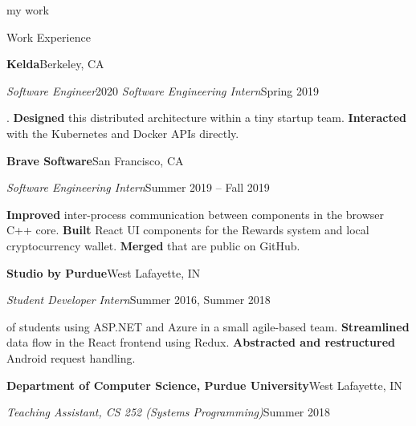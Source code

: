 \begin{minipage}[t]{0.665\textwidth}
  {\Huge my work \phantom{me}}

  \vspace{10pt}

  {\sectionfont Work Experience}

  \vspace{5pt}
  \textbf{Kelda}\quad{}\hfill Berkeley, CA
  \begin{adjustwidth}{10pt}{}
    \emph{Software Engineer}\hfill 2020
    \emph{Software Engineering Intern}\hfill Spring 2019

    .
    \textbf{Designed} this distributed architecture within a tiny startup team.
    \textbf{Interacted} with the Kubernetes and Docker APIs directly.
  \end{adjustwidth}

  \vspace{5pt}
  \textbf{Brave Software}\quad{}\hfill San Francisco, CA
  \begin{adjustwidth}{10pt}{}
    \emph{Software Engineering Intern}\hfill Summer 2019 -- Fall 2019

    \textbf{Improved} inter-process communication between components in the browser C++ core.
    \textbf{Built} React UI components for the Rewards system and local cryptocurrency wallet.
    \textbf{Merged}  that are public on GitHub.
  \end{adjustwidth}

  \vspace{5pt}
  \textbf{Studio by Purdue}\hfill West Lafayette, IN
  \begin{adjustwidth}{10pt}{}
    \emph{Student Developer Intern}\hfill Summer 2016, Summer 2018

     of students using ASP.NET and Azure in a small agile-based team.
    \textbf{Streamlined} data flow in the React frontend using Redux.
    \textbf{Abstracted and restructured} Android request handling.
  \end{adjustwidth}

  \vspace{5pt}
  \textbf{Department of Computer Science, Purdue University}\hfill West Lafayette, IN
  \begin{adjustwidth}{10pt}{}
    \emph{Teaching Assistant, CS 252 (Systems Programming)}\hfill Summer 2018


\end{adjustwidth}
\end{minipage}
